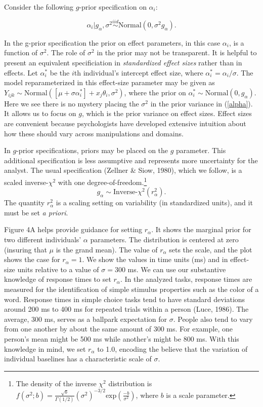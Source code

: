 \documentclass[american,man]{apa6}
\begin{document}
Consider the following \(g\)-prior specification on \(\alpha_i\):

\begin{equation} \label{alpha}
\alpha_i | g_{\alpha},\sigma^2 \stackrel{iid}{\sim} \mbox{Normal}(0, \sigma^2 g_{\alpha}).
\end{equation}

In the g-prior specification the prior on effect parameters, in this
case \(\alpha_i\), is a function of \(\sigma^2\). The role of
\(\sigma^2\) in the prior may not be transparent. It is helpful to
present an equivalent specificiation in \emph{standardized effect sizes}
rather than in effects. Let \(\alpha_i^*\) be the \(i\)th individual's
intercept effect size, where \(\alpha_i^*=\alpha_i/\sigma\). The model
reparameterized in this effect-size parameter may be given as
\(Y_{ijk} \sim \mbox{Normal}([\mu+\sigma\alpha_i^*]+x_j\theta_i,\sigma^2)\),
where the prior on \(\alpha_i^* \sim \mbox{Normal}(0, g_{\alpha})\).
Here we see there is no mystery placing the \(\sigma^2\) in the prior
variance in (\ref{alpha}). It allows us to focus on \(g\), which is the
prior variance on effect sizes. Effect sizes are convenient because
psychologists have developed extensive intuition about how these should
vary across manipulations and domains.

In \(g\)-prior specifications, priors may be placed on the \(g\)
parameter. This additional specification is less assumptive and
represents more uncertainty for the analyst. The usual specification
(Zellner \& Siow, 1980), which we follow, is a scaled inverse-\(\chi^2\)
with one degree-of-freedom.\footnote{The density of the inverse
  \(\chi^2\) distribution is
  \(f(\sigma^2;b)=\frac{\sqrt{b}}{\Gamma(1/2)}\left(\sigma^2\right)^{-3/2}\mbox{exp}\left(\frac{-b}{\sigma^2}\right)\),
  where \(b\) is a scale parameter.} \[
g_{\alpha} \sim \mbox{Inverse-$\chi^2$} (r_{\alpha}^2).
\] The quantity \(r_{\alpha}^2\) is a scaling setting on variability (in
standardized units), and it must be set \emph{a priori}.

Figure 4A helps provide guidance for setting \(r_\alpha\). It shows the
marginal prior for two different individuals' \(\alpha\) parameters. The
distribution is centered at zero (insuring that \(\mu\) is the grand
mean). The value of \(r_\alpha\) sets the scale, and the plot shows the
case for \(r_\alpha=1\). We show the values in time units (ms) and in
effect-size units relative to a value of \(\sigma = 300\) ms. We can use
our substantive knowledge of response times to set \(r_\alpha\). In the
analyzed tasks, response times are measured for the identification of
simple stimulus properties such as the color of a word. Response times
in simple choice tasks tend to have standard deviations around 200 ms to
400 ms for repeated trials within a person (Luce, 1986). The average,
300 ms, serves as a ballpark expectation for \(\sigma\). People also
tend to vary from one another by about the same amount of 300 ms. For
example, one person's mean might be 500 ms while another's might be 800
ms. With this knowledge in mind, we set \(r_{\alpha}\) to 1.0, encoding
the believe that the variation of individual baselines has a
characteristic scale of \(\sigma\).
\end{document}
